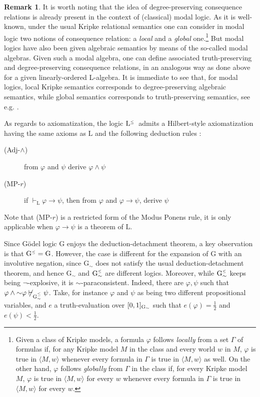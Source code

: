 \documentclass{article}
\theoremstyle{definition}
\newtheorem{remark}{Remark}
\newcommand{\ninv}{\mathord{\sim}}
\newcommand{\logic}[1]{\mathrm{ #1}}
\newcommand{\Gsimleq}{\mathrm{G}\mystrut^{\text{\tiny $\leq$}}_{\sim}}
\newcommand\mystrut{\rule{0pt}{7pt}}
\begin{document}
{
\begin{remark} It is worth noting that the idea of degree-preserving consequence relations is already present in the context of (classical) modal logic. As it is well-known, under the usual Kripke relational semantics one can consider in modal logic two notions of consequence relation: a {\em local}  and a {\em global} one.\footnote{Given a class of Kripke models,
a formula $\varphi$ follows {\em locally} from a set $\Gamma$ of formulas if, for any Kripke model $M$ in the class and every world $w$ in $M$, $\varphi$ is true in $\langle M,w\rangle$ whenever every formula in $\Gamma$ is true in $\langle M,w\rangle$ as well.  On the other hand,  $\varphi$ follows {\em globally} from $\Gamma$ in the class if, for every Kripke model $M$,  $\varphi$ is true in $\langle M,w\rangle$ for every $w$ whenever every formula in $\Gamma$ is true in $\langle M,w\rangle$ for every $w$.} But modal logics have also been given algebraic semantics by means of the so-called modal algebras. Given such a modal algebra, one can define associated truth-preserving and degree-preserving consequence relations, in an analogous way as done above for a given linearly-ordered L-algebra. It is immediate to see that, for modal logics, local Kripke semantics corresponds to degree-preserving algebraic semantics, while global semantics corresponds to truth-preserving semantics, see e.g. \cite[Defs. 1.35 and 1.37]{modalbook}.
\end{remark}
}


As regards to axiomatization, the logic $\logic{L}^{\mbox{\tiny $\leq$ }}$ admits a Hilbert-style axiomatization having  the same axioms as $\logic{L}$ and the following deduction rules \cite{BEFGGTV}:
\begin{description}
\item[(Adj-$\wedge$)] from $\varphi$ and $\psi$ derive $\varphi\wedge\psi$
\item[(MP-$r$)] if $\vdash_{\logic{L}}\varphi\to\psi$, then from $\varphi$ and $\varphi \to \psi$, derive $\psi$
\end{description}
Note that (MP-$r$) is a restricted form of the Modus Ponens rule, it is only applicable when $\varphi\to\psi$ is a  theorem of $\logic{L}$. 

Since G\"odel logic G enjoys the deduction-detachment theorem, a key observation is that ${ \rm G}^{\mbox{\tiny $\leq$}} = {\rm G}$. However, the case is different for the expansion of G with an involutive negation, since G$_\sim$ does not satisfy the usual deduction-detachment theorem, and hence G$_\sim$ and $\Gsimleq$ are different logics. Moreover, while  $\Gsimleq$ keeps being $\neg$-explosive, it is $\sim$-paraconsistent. Indeed, there are $\varphi, \psi$ such that $\varphi \land \ninv \varphi \not\vdash_{\Gsimleq} 
\psi$. Take, for instance $\varphi$ and $\psi$ as being two different propositional variables, and $e$ a truth-evaluation over $[0, 1]_{\rm{G}_\sim}$ such that $e(\varphi)=\frac{1}{2}$ and $e(\psi) < \frac{1}{2}$.
\end{document}
